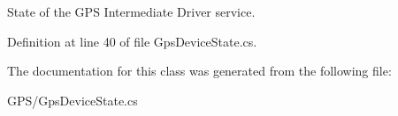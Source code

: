 State of the GPS Intermediate Driver service. 

Definition at line 40 of file GpsDeviceState.cs.

The documentation for this class was generated from the following file:\begin{DoxyCompactItemize}
\item 
GPS/GpsDeviceState.cs\end{DoxyCompactItemize}
